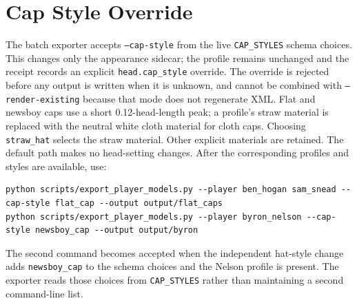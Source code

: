 \documentclass{article}
\begin{document}
\section{Cap Style Override}
The batch exporter accepts \texttt{--cap-style} from the live \texttt{CAP\_STYLES} schema choices. This changes only the appearance
sidecar; the profile remains unchanged and the receipt records an explicit
\texttt{head.cap\_style} override. The override is rejected before any
output is written when it is unknown, and cannot be combined with
\texttt{--render-existing} because that mode does not regenerate XML.
Flat and newsboy caps use a short 0.12-head-length peak; a profile's straw
material is replaced with the neutral white cloth material for cloth caps.
Choosing \texttt{straw\_hat} selects the straw material. Other explicit
materials are retained. The default path makes no head-setting changes.
After the corresponding profiles and styles are available, use:
\begin{verbatim}
python scripts/export_player_models.py --player ben_hogan sam_snead --cap-style flat_cap --output output/flat_caps
python scripts/export_player_models.py --player byron_nelson --cap-style newsboy_cap --output output/byron
\end{verbatim}
The second command becomes accepted when the independent hat-style change adds
\texttt{newsboy\_cap} to the schema choices and the Nelson profile is present.
The exporter reads those choices from \texttt{CAP\_STYLES} rather than
maintaining a second command-line list.
\end{document}

